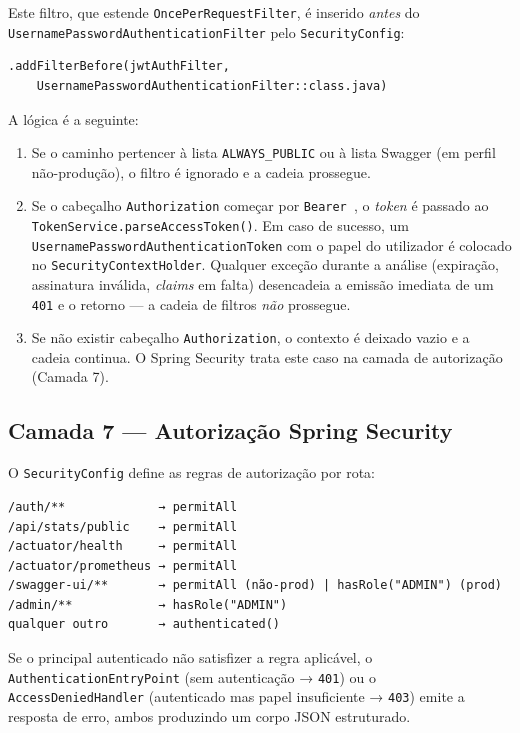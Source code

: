 Este filtro, que estende \texttt{OncePerRequestFilter}, é inserido
\emph{antes} do \texttt{UsernamePasswordAuthenticationFilter} pelo
\texttt{SecurityConfig}:

\begin{verbatim}
.addFilterBefore(jwtAuthFilter,
    UsernamePasswordAuthenticationFilter::class.java)
\end{verbatim}

A lógica é a seguinte:

\begin{enumerate}
  \item Se o caminho pertencer à lista \texttt{ALWAYS\_PUBLIC} ou à lista
    Swagger (em perfil não-produção), o filtro é ignorado e a cadeia
    prossegue.
  \item Se o cabeçalho \texttt{Authorization} começar por \texttt{Bearer },
    o \textit{token} é passado ao \texttt{TokenService.parseAccessToken()}.
    Em caso de sucesso, um \texttt{UsernamePasswordAuthenticationToken}
    com o papel do utilizador é colocado no \texttt{SecurityContextHolder}.
    Qualquer exceção durante a análise (expiração, assinatura inválida,
    \textit{claims} em falta) desencadeia a emissão imediata de um
    \texttt{401} e o retorno — a cadeia de filtros \emph{não} prossegue.
  \item Se não existir cabeçalho \texttt{Authorization}, o contexto é
    deixado vazio e a cadeia continua.
    O Spring Security trata este caso na camada de autorização (Camada 7).
\end{enumerate}

\subsection*{Camada 7 — Autorização Spring Security}

O \texttt{SecurityConfig} define as regras de autorização por rota:

\begin{verbatim}
/auth/**             → permitAll
/api/stats/public    → permitAll
/actuator/health     → permitAll
/actuator/prometheus → permitAll
/swagger-ui/**       → permitAll (não-prod) | hasRole("ADMIN") (prod)
/admin/**            → hasRole("ADMIN")
qualquer outro       → authenticated()
\end{verbatim}

Se o principal autenticado não satisfizer a regra aplicável, o
\texttt{AuthenticationEntryPoint} (sem autenticação → \texttt{401}) ou o
\texttt{AccessDeniedHandler} (autenticado mas papel insuficiente → \texttt{403})
emite a resposta de erro, ambos produzindo um corpo JSON estruturado.

